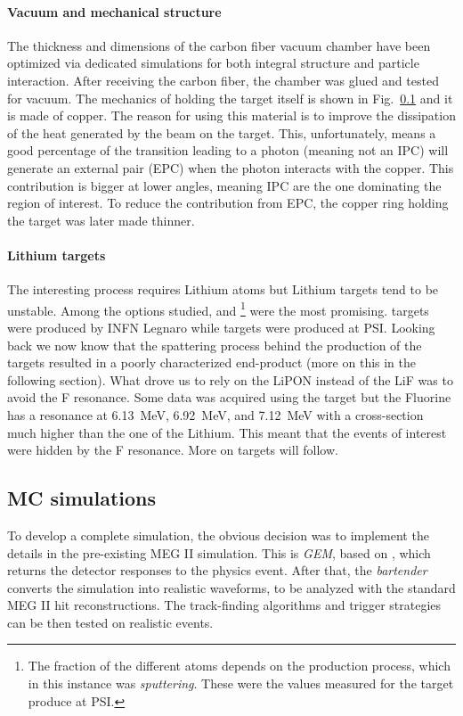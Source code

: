 \begin{refsection}
        \paragraph{Vacuum and mechanical structure}
        The thickness and dimensions of the carbon fiber vacuum chamber have been optimized via dedicated simulations for both integral structure and particle interaction.
        After receiving the carbon fiber, the chamber was glued and tested for vacuum.
        The mechanics of holding the target itself is shown in Fig.~\ref{} and it is made of copper.
        The reason for using this material is to improve the dissipation of the heat generated by the beam on the target.
        This, unfortunately, means a good percentage of the transition leading to a photon (meaning not an IPC) will generate an external pair (EPC) when the photon interacts with the copper.
        This contribution is bigger at lower angles, meaning IPC are the one dominating the region of interest.
        To reduce the contribution from EPC, the copper ring holding the target was later made thinner. 
        
        \paragraph{Lithium targets}
        The interesting process requires Lithium atoms but Lithium targets tend to be unstable. 
        Among the options studied,  and \footnote{The fraction of the different atoms depends on the production process, which in this instance was \textit{sputtering}. These were the values measured for the target produce at PSI.} were the most promising.
         targets were produced by INFN Legnaro while  targets were produced at PSI.
        Looking back we now know that the spattering process behind the production of the  targets resulted in a poorly characterized end-product (more on this in the following section).
        What drove us to rely on the LiPON instead of the LiF was to avoid the F resonance. 
        Some data was acquired using the  target but the Fluorine has a resonance at \SI{6.13}{MeV}, \SI{6.92}{MeV}, and \SI{7.12}{MeV} with a cross-section much higher than the one of the Lithium.
        This meant that the events of interest were hidden by the F resonance.
        More on targets will follow.

    \subsection{MC simulations}
        To develop a complete simulation, the obvious decision was to implement the details in the pre-existing MEG II simulation.
        This is \textit{GEM}, based on \gf, which returns the detector responses to the physics event. 
        After that, the \textit{bartender} converts the simulation into realistic waveforms, to be analyzed with the standard MEG II hit reconstructions.
        The track-finding algorithms and trigger strategies can be then tested on realistic events.
        

\end{refsection}

